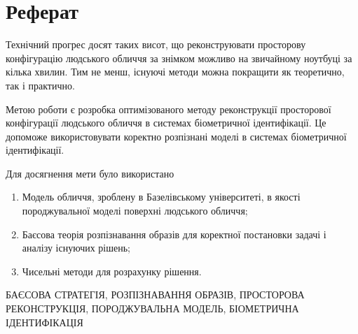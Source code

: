 \chapter*{Реферат}

Технічний прогрес досят таких висот,
що реконструювати просторову конфігурацію людського обличчя за знімком
можливо на звичайному ноутбуці за кілька хвилин.
Тим не менш, існуючі методи можна покращити як теоретично, так і практично.

Метою роботи є
розробка оптимізованого методу реконструкції просторової конфігурації
людського обличчя в системах біометричної ідентифікації.
Це допоможе використовувати коректно розпізнані моделі
в системах біометричної ідентифікації.

Для досягнення мети було використано
\begin{enumerate}
  \item
    Модель обличчя, зроблену в Базелівському університеті,
    в якості породжувальної моделі поверхні людського обличчя;
  \item
    Баєсова теорія розпізнавання образів
    для коректної постановки задачі і аналізу існуючих рішень;
  \item
    Чисельні методи для розрахунку рішення.
\end{enumerate}

\MakeUppercase{баєсова стратегія, розпізнавання образів,
просторова реконструкція, породжувальна модель,
біометрична ідентифікація}
